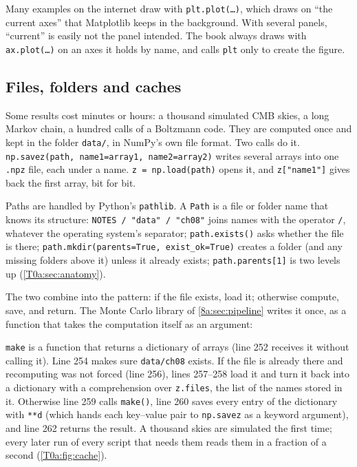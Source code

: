 \begin{pitfall}
Many examples on the internet draw with \texttt{plt.plot(\dots)}, which draws on ``the current axes'' that Matplotlib keeps in the background. With several panels, ``current'' is easily not the panel intended. The book always draws with \texttt{ax.plot(\dots)} on an axes it holds by name, and calls \texttt{plt} only to create the figure.
\end{pitfall}

\subsection{Files, folders and caches}
\label{T0a:sec:files}

Some results cost minutes or hours: a thousand simulated CMB skies, a long Markov chain, a hundred calls of a Boltzmann code. They are computed once and kept in the folder \texttt{data/}, in NumPy's own file format. Two calls do it. \texttt{np.savez(path, name1=array1, name2=array2)} writes several arrays into one \texttt{.npz} file, each under a name. \texttt{z = np.load(path)} opens it, and \texttt{z["name1"]} gives back the first array, bit for bit.

Paths are handled by Python's \texttt{pathlib}. A \texttt{Path} is a file or folder name that knows its structure: \texttt{NOTES / "data" / "ch08"} joins names with the operator \texttt{/}, whatever the operating system's separator; \texttt{path.exists()} asks whether the file is there; \texttt{path.mkdir(parents=True, exist\_ok=True)} creates a folder (and any missing folders above it) unless it already exists; \texttt{path.parents[1]} is two levels up (\cref{T0a:sec:anatomy}).

The two combine into the  pattern: if the file exists, load it; otherwise compute, save, and return. The Monte Carlo library of \cref{8a:sec:pipeline} writes it once, as a function that takes the computation itself as an argument:


\texttt{make} is a function that returns a dictionary of arrays (line 252 receives it without calling it). Line 254 makes sure \texttt{data/ch08} exists. If the file is already there and recomputing was not forced (line 256), lines 257--258 load it and turn it back into a dictionary with a comprehension over \texttt{z.files}, the list of the names stored in it. Otherwise line 259 calls \texttt{make()}, line 260 saves every entry of the dictionary with \texttt{**d} (which hands each key--value pair to \texttt{np.savez} as a keyword argument), and line 262 returns the result. A thousand skies are simulated the first time; every later run of every script that needs them reads them in a fraction of a second (\cref{T0a:fig:cache}).

